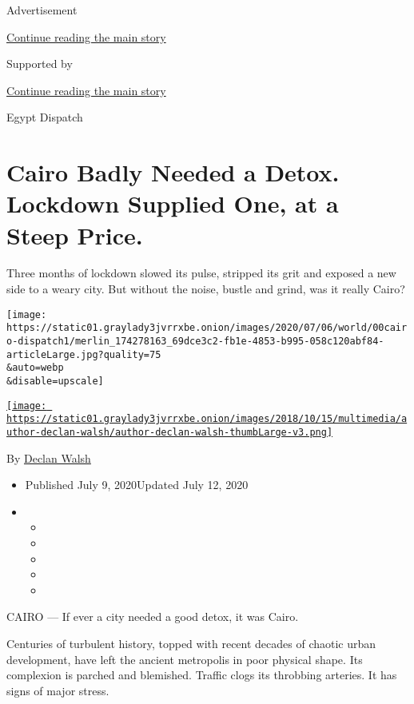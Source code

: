 Advertisement

\protect\hyperlink{after-top}{Continue reading the main story}

Supported by

\protect\hyperlink{after-sponsor}{Continue reading the main story}

Egypt Dispatch

\hypertarget{cairo-badly-needed-a-detox-lockdown-supplied-one-at-a-steep-price}{%
\section{Cairo Badly Needed a Detox. Lockdown Supplied One, at a Steep
Price.}\label{cairo-badly-needed-a-detox-lockdown-supplied-one-at-a-steep-price}}

Three months of lockdown slowed its pulse, stripped its grit and exposed
a new side to a weary city. But without the noise, bustle and grind, was
it really Cairo?

\texttt{[image: https://static01.graylady3jvrrxbe.onion/images/2020/07/06/world/00cairo-dispatch1/merlin\_174278163\_69dce3c2-fb1e-4853-b995-058c120abf84-articleLarge.jpg?quality=75\\\&auto=webp\\\&disable=upscale]}

\href{https://www.nytimes3xbfgragh.onion/by/declan-walsh}{\texttt{[image: https://static01.graylady3jvrrxbe.onion/images/2018/10/15/multimedia/author-declan-walsh/author-declan-walsh-thumbLarge-v3.png]}}

By \href{https://www.nytimes3xbfgragh.onion/by/declan-walsh}{Declan
Walsh}

\begin{itemize}
\item
  Published July 9, 2020Updated July 12, 2020
\item
  \begin{itemize}
  \item
  \item
  \item
  \item
  \item
  \end{itemize}
\end{itemize}

CAIRO --- If ever a city needed a good detox, it was Cairo.

Centuries of turbulent history, topped with recent decades of chaotic
urban development, have left the ancient metropolis in poor physical
shape. Its complexion is parched and blemished. Traffic clogs its
throbbing arteries. It has signs of major stress.

